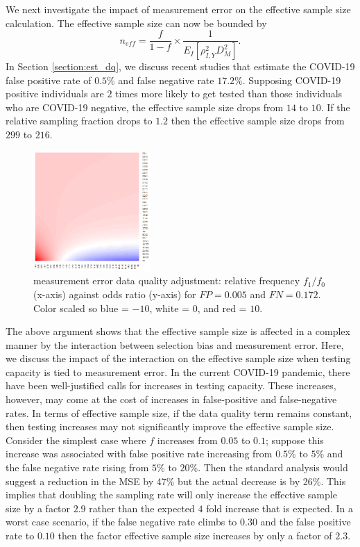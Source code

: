 \documentclass[aoas]{amsart}
\begin{document}
We next investigate the impact of measurement error on the effective sample size calculation.  The effective sample size can now be bounded by
$$
n_{eff} = \frac{f}{1-f} \times \frac{1}{E_{I} \left[ \rho_{I,Y}^2 D_M^2 \right]}.
$$
In Section \ref{section:est_dq}, we discuss recent studies that estimate the COVID-19 false positive rate of $0.5$\% and false negative rate $17.2$\%.  Supposing COVID-19 positive individuals are $2$ times more likely to get tested than those individuals who are COVID-19 negative, the effective sample size drops from $14$ to $10$. If the relative sampling fraction drops to $1.2$ then the effective sample size drops from $299$ to $216$.

\begin{figure}
\centering
\includegraphics[width = 0.4\textwidth]{../methods/figs/mem_heatmap_article.png}
\caption{measurement error data quality adjustment: relative frequency $f_1/f_0$ (x-axis) against odds ratio (y-axis) for $FP=0.005$ and $FN=0.172$. Color scaled so blue = $-10$, white = $0$, and red = $10$.}
\label{fig:heatmap}
\vspace{-0.3cm}
\end{figure}


The above argument shows that the effective sample size is affected in a complex manner by the interaction between selection bias and measurement error.  Here, we discuss the impact of the interaction on the effective sample size when testing capacity is tied to measurement error.  In the current COVID-19 pandemic, there have been well-justified calls for increases in testing capacity.  These increases, however, may come at the cost of increases in false-positive and false-negative rates.  In terms of effective sample size, if the data quality term remains constant, then testing increases may not significantly improve the effective sample size.  Consider the simplest case where $f$ increases from $0.05$ to $0.1$; suppose this increase was associated with  false positive rate increasing from $0.5$\% to $5$\% and the false negative rate rising from $5\%$ to $20$\%.  Then the standard analysis would suggest a reduction in the MSE by 47\% but the actual decrease is by 26\%.  This implies that doubling the sampling rate will only increase the effective sample size by a factor $2.9$ rather than the expected $4$ fold increase that is expected.  In a worst case scenario, if the false negative rate climbs to $0.30$ and the false positive rate to $0.10$ then the factor effective sample size increases by only a factor of $2.3$.
\end{document}
